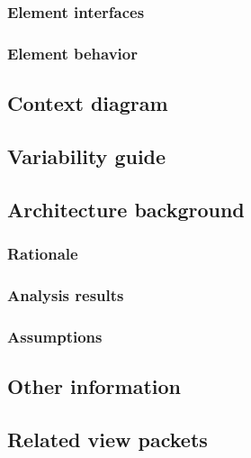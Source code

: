 \documentclass[a4paper,10pt]{book}
\begin{document}
\subsubsection{Element interfaces}

\subsubsection{Element behavior}

\subsection{Context diagram}

\subsection{Variability guide}

\subsection{Architecture background}

\subsubsection{Rationale}

\subsubsection{Analysis results}

\subsubsection{Assumptions}

\subsection{Other information}

\subsection{Related view packets}
\end{document}
